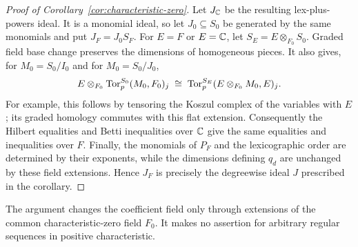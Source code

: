 \begin{proof}[Proof of Corollary~\ref{cor:characteristic-zero}]
Let \(J_{\mathbb C}\) be the resulting lex-plus-powers ideal. It is a monomial
ideal, so let \(J_0\subseteq S_0\) be generated by the same monomials and
put \(J_F=J_0S_F\). For \(E=F\) or \(E=\mathbb C\), let
\(S_E=E\otimes_{F_0}S_0\). Graded field base change preserves the
dimensions of homogeneous pieces. It also gives, for \(M_0=S_0/I_0\)
and for \(M_0=S_0/J_0\),
\[
 E\otimes_{F_0}\operatorname{Tor}^{S_0}_p(M_0,F_0)_j
 \;\cong\;
 \operatorname{Tor}^{S_E}_p(E\otimes_{F_0}M_0,E)_j.
\]
For example, this follows by tensoring the Koszul complex of the
variables with \(E\); its graded homology commutes with this flat
extension. Consequently the Hilbert equalities and Betti inequalities
over \(\mathbb C\) give the same equalities and inequalities over \(F\).
Finally, the monomials of \(P_F\) and the lexicographic order are
determined by their exponents, while the dimensions defining \(q_d\)
are unchanged by these field extensions. Hence \(J_F\) is precisely
the degreewise ideal \(J\) prescribed in the corollary.
\end{proof}

The argument changes the coefficient field only through extensions of
the common characteristic-zero field \(F_0\). It makes no assertion for
arbitrary regular sequences in positive characteristic.
